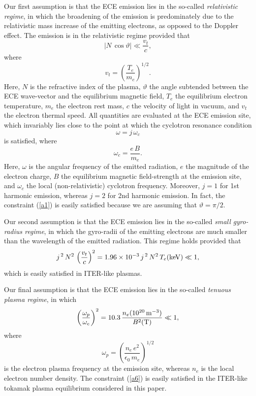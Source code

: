\documentclass{iopjournal}
\begin{document}
{Our first assumption is that the ECE emission lies in the so-called {\em relativistic regime}, in which the
broadening of the emission is predominately due to the relativistic mass increase of the emitting electrons, as opposed to the Doppler effect. The
emission is in the relativistic regime provided that
\begin{equation}\label{a1}
|N\,\cos\vartheta|  \ll \frac{v_t}{c},
\end{equation}
where
\begin{equation}
v_t = \left(\frac{T_e}{m_e}\right)^{1/2}.
\end{equation}
Here, $N$ is the refractive index of the plasma, $\vartheta$ the angle subtended between the ECE wave-vector and the equilibrium magnetic field, $T_e$ the equilibrium electron
temperature, $m_e$ the electron rest mass, $c$ the velocity of light in vacuum, and $v_t$ the electron thermal speed.  All quantities are evaluated at the ECE emission site, which invariably
lies 
close to the point at which the cyclotron resonance condition
\begin{equation}
\omega = j\,\omega_c
\end{equation}
is satisfied, 
where 
\begin{equation}
\omega_c = \frac{e\,B}{m_e}.
\end{equation}
Here, $\omega$ is the angular frequency of the emitted radiation, $e$ the magnitude of the electron charge, $B$ the equilibrium magnetic field-strength at the emission site, and $\omega_c$  the local (non-relativistic) cyclotron frequency. 
Moreover, $j=1$ for 1st harmonic emission, whereas $j=2$ for 2nd harmonic emission. In fact, the constraint (\ref{a1}) is easily satisfied because we are assuming that
$\vartheta=\pi/2$. 

Our second assumption is that the ECE emission lies in the so-called {\em small gyro-radius regime}, in which the gyro-radii of the emitting electrons are much smaller than
the wavelength of the emitted radiation. This regime holds provided that 
\begin{equation}
j^{\,2}\,N^2\,\left(\frac{v_t}{c}\right)^2 = 1.96\times 10^{-3}\,j^{\,2}\,N^2\,T_e({\rm keV}) \ll 1,
\end{equation}
which is easily satisfied in ITER-like plasmas. 

Our final assumption is that the ECE emission lies in the so-called {\em tenuous plasma regime}, in which
\begin{equation}\label{a6}
\left(\frac{\omega_p}{\omega_c}\right)^2 = 10.3\,\frac{n_e(10^{20}\,{\rm m}^{-3})}{B^2({\rm T})}\ll 1,
\end{equation}
where
\begin{equation}
\omega_p = \left(\frac{n_e\,e^2}{\epsilon_0\,m_e}\right)^{1/2}
\end{equation}
is the electron plasma frequency at the emission site, whereas $n_e$ is the local electron number density. The constraint (\ref{a6}) is
easily satisfied in the ITER-like tokamak plasma equilibrium considered in this paper. 

}
\end{document}
